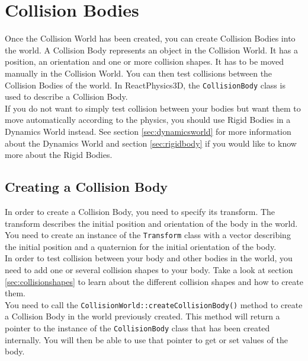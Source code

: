 \documentclass[a4paper,12pt]{article}
\begin{document}
    \section{Collision Bodies}

    Once the Collision World has been created, you can create Collision Bodies into the world. A Collision Body represents an object in the Collision World.
    It has a position, an orientation and one or more collision shapes. It has to be moved manually in the Collision World. You can then
    test collisions between the Collision Bodies of the world. In ReactPhysics3D, the \texttt{CollisionBody} class is used to describe a Collision Body. \\

    If you do not want to simply test collision between your bodies but want them to move automatically according to the physics, you should use Rigid Bodies in a
    Dynamics World instead. See section \ref{sec:dynamicsworld} for more information about the Dynamics World and section \ref{sec:rigidbody} if you would like to know more
    about the Rigid Bodies.

    \subsection{Creating a Collision Body}

    In order to create a Collision Body, you need to specify its transform. The transform describes the initial
    position and orientation of the body in the world. You need to create an instance of the \texttt{Transform} class with a vector describing the
    initial position and a quaternion for the initial orientation of the body. \\

    In order to test collision between your body and other bodies in the world, you need to add one or several collision shapes to your body.
    Take a look at section \ref{sec:collisionshapes} to learn about the different collision shapes and how to create them. \\

    You need to call the \texttt{CollisionWorld::createCollisionBody()} method to create a Collision Body in the world previously created. This method will return a pointer to the instance
    of the \texttt{CollisionBody} class that has been created internally. You will then be able to use that pointer to get or set values of the body. \\
\end{document}
